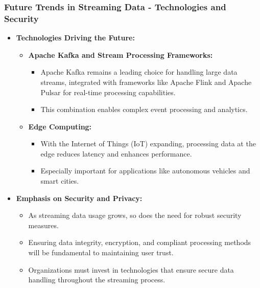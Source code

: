 \documentclass[aspectratio=169]{beamer}
\begin{document}
\begin{frame}[fragile]
    \frametitle{Future Trends in Streaming Data - Technologies and Security}
    \begin{itemize}
        \item \textbf{Technologies Driving the Future:}
            \begin{itemize}
                \item \textbf{Apache Kafka and Stream Processing Frameworks:}
                    \begin{itemize}
                        \item Apache Kafka remains a leading choice for handling large data streams, integrated with frameworks like Apache Flink and Apache Pulsar for real-time processing capabilities.
                        \item This combination enables complex event processing and analytics.
                    \end{itemize}

                \item \textbf{Edge Computing:}
                    \begin{itemize}
                        \item With the Internet of Things (IoT) expanding, processing data at the edge reduces latency and enhances performance.
                        \item Especially important for applications like autonomous vehicles and smart cities.
                    \end{itemize}
            \end{itemize}
    
        \item \textbf{Emphasis on Security and Privacy:}
            \begin{itemize}
                \item As streaming data usage grows, so does the need for robust security measures.
                \item Ensuring data integrity, encryption, and compliant processing methods will be fundamental to maintaining user trust.
                \item Organizations must invest in technologies that ensure secure data handling throughout the streaming process.
            \end{itemize}
    \end{itemize}
\end{frame}
\end{document}
